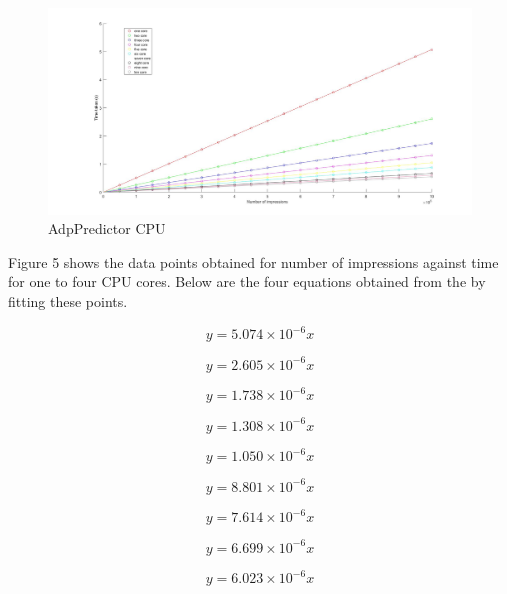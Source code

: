 \documentclass[a4paper,11pt]{article}
\begin{document}
\begin{figure}[H]
	\hspace*{-2.8cm}  
	\includegraphics[scale=0.3]{images/impressions_time}
	\caption{AdpPredictor CPU}
\end{figure}

\noindent Figure 5 shows the data points obtained for number of impressions against time for one to four CPU cores. Below are the four equations obtained from the by fitting these points.

\begin{equation}
y = 5.074\times 10^{-6}x
\end{equation}

\begin{equation}
y = 2.605\times 10^{-6}x
\end{equation}

\begin{equation}
y = 1.738\times 10^{-6}x
\end{equation}

\begin{equation}
y = 1.308\times 10^{-6}x
\end{equation}

\begin{equation}
y = 1.050\times 10^{-6}x
\end{equation}

\begin{equation}
y = 8.801\times 10^{-6}x
\end{equation}

\begin{equation}
y = 7.614\times 10^{-6}x
\end{equation}

\begin{equation}
y = 6.699\times 10^{-6}x
\end{equation}

\begin{equation}
y = 6.023\times 10^{-6}x
\end{equation}
\end{document}
